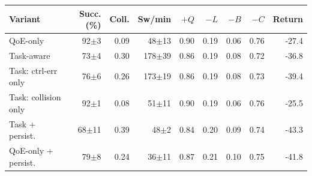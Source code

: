 \begin{tabular}{lrrrrrrrr}
\hline
Variant & Succ.(\%) & Coll. & Sw/min & $+Q$ & $-L$ & $-B$ & $-C$ & Return \\
\hline
QoE-only & 92$\pm$3 & 0.09 & 48$\pm$13 & 0.90 & 0.19 & 0.06 & 0.76 & -27.4 \\
Task-aware & 73$\pm$4 & 0.30 & 178$\pm$39 & 0.86 & 0.19 & 0.08 & 0.72 & -36.8 \\
Task: ctrl-err only & 76$\pm$6 & 0.26 & 173$\pm$19 & 0.86 & 0.19 & 0.08 & 0.73 & -39.4 \\
Task: collision only & 92$\pm$1 & 0.08 & 51$\pm$11 & 0.90 & 0.19 & 0.06 & 0.76 & -25.5 \\
Task + persist. & 68$\pm$11 & 0.39 & 48$\pm$2 & 0.84 & 0.20 & 0.09 & 0.74 & -43.3 \\
QoE-only + persist. & 79$\pm$8 & 0.24 & 36$\pm$11 & 0.87 & 0.21 & 0.10 & 0.75 & -41.8 \\
\hline
\end{tabular}
